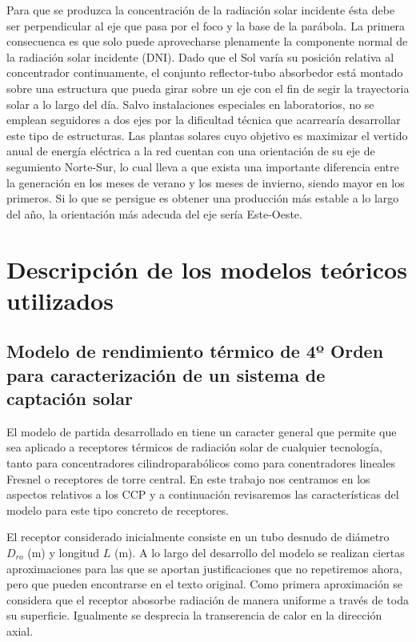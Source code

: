 \documentclass[12pt]{report} %
\begin{document}
Para que se produzca la concentración de la radiación solar incidente ésta debe ser perpendicular al eje que pasa por el foco y la base de la parábola. La primera consecuenca es que solo puede aprovecharse plenamente la componente normal de la radiación solar incidente (DNI). Dado que el Sol varía su posición relativa al concentrador continuamente, el conjunto reflector-tubo absorbedor está montado sobre una estructura que pueda girar sobre un eje con el fin de segir la trayectoria solar a lo largo del día. Salvo instalaciones especiales en laboratorios, no se emplean seguidores a dos ejes por la dificultad técnica que acarrearía desarrollar este tipo de estructuras. Las plantas solares cuyo objetivo es maximizar el vertido anual de energía eléctrica a la red cuentan con una orientación de su eje de segumiento Norte-Sur, lo cual lleva a que exista una importante diferencia entre la generación en los meses de verano y los meses de invierno, siendo mayor en los primeros. Si lo que se persigue es obtener una producción más estable a lo largo del año, la orientación más adecuda del eje sería Este-Oeste.


\chapter{Descripción de los modelos teóricos utilizados}

\section{Modelo de rendimiento térmico de 4º Orden para caracterización de un sistema de captación solar}
El modelo de partida desarrollado en \cite{barberofresnoDesarrolloModeloTeorico2018} tiene un caracter general que permite que sea aplicado a receptores térmicos de radiación solar de cualquier tecnología, tanto para concentradores cilindroparabólicos como para conentradores lineales Fresnel o receptores de torre central. En este trabajo nos centramos en los aspectos relativos a los CCP y a continuación revisaremos las características del modelo para este tipo concreto de receptores.

El receptor considerado inicialmente consiste en un tubo desnudo de diámetro \(D_{ro}\) (m) y longitud \(L\) (m). A lo largo del desarrollo del modelo se realizan ciertas aproximaciones para las que se aportan justificaciones que no repetiremos ahora, pero que pueden encontrarse en el texto original. Como primera aproximación se considera que el receptor abosorbe radiación de manera uniforme a través de toda su superficie. Igualmente se desprecia la transerencia de calor en la
dirección axial.
\end{document}
